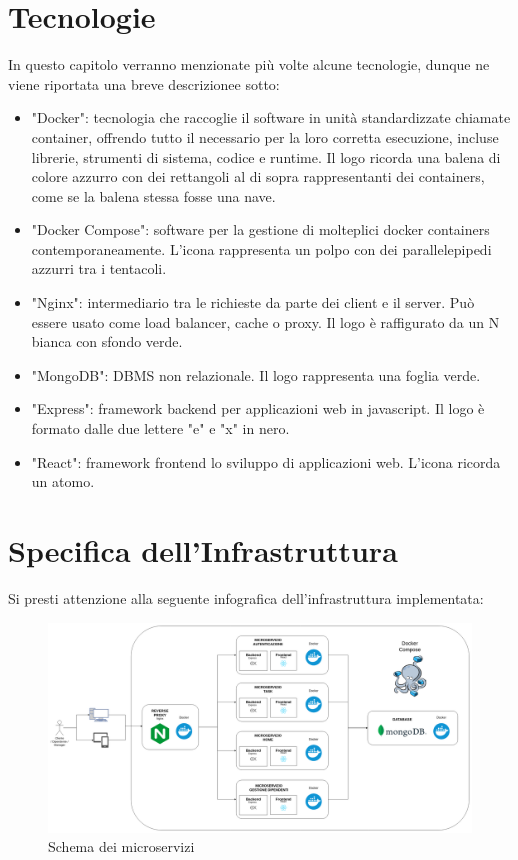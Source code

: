 \documentclass{report}
\begin{document}
\section{Tecnologie}

In questo capitolo verranno menzionate più volte alcune tecnologie, dunque ne viene riportata una breve descrizionee sotto:
\begin{itemize}
	\item "Docker": tecnologia che raccoglie il software in unità standardizzate chiamate container, offrendo tutto il necessario per la loro corretta esecuzione, incluse librerie, strumenti di sistema, codice e runtime. Il logo ricorda una balena di colore azzurro con dei rettangoli al di sopra rappresentanti dei containers, come se la balena stessa fosse una nave.
	\item "Docker Compose": software per la gestione di molteplici docker containers contemporaneamente. L'icona rappresenta un polpo con dei parallelepipedi azzurri tra i tentacoli.
	\item "Nginx": intermediario tra le richieste da parte dei client e il server. Può essere usato come load balancer, cache o proxy. Il logo è raffigurato da un N bianca con sfondo verde.
	\item "MongoDB": DBMS non relazionale. Il logo rappresenta una foglia verde.
	\item "Express": framework backend per applicazioni web in javascript. Il logo è formato dalle due lettere "e" e "x" in nero.
	\item "React": framework frontend lo sviluppo di applicazioni web. L'icona ricorda un atomo.
\end{itemize}

\section{Specifica dell'Infrastruttura}

Si presti attenzione alla seguente infografica dell'infrastruttura implementata:

\begin{figure}[H]
	\centering\includegraphics[width=1\textwidth]{images/diagramma_microservizi.png}
	Schema dei microservizi
\end{figure}
\end{document}
